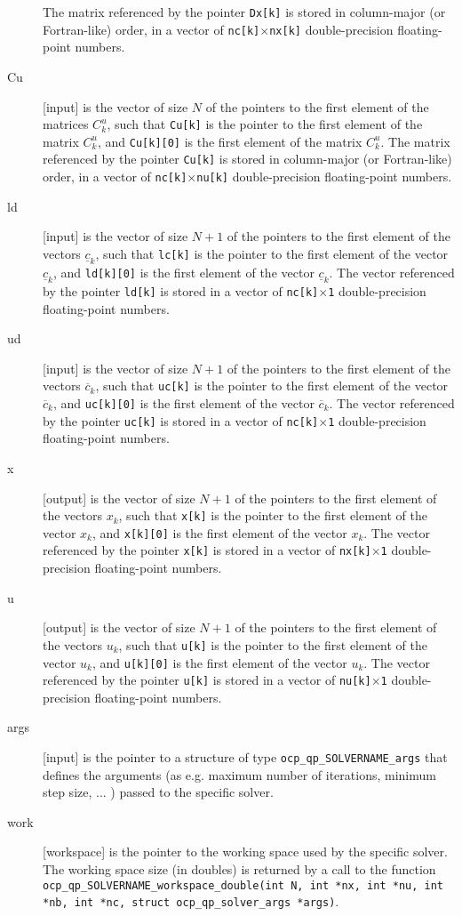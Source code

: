 \documentclass{report}
\begin{document}
\begin{description}
The matrix referenced by the pointer {\tt Dx[k]} is stored in column-major (or Fortran-like) order, in a vector of {\tt nc[k]$\times$nx[k]} double-precision floating-point numbers.
\item[Cu] [input] is the vector of size $N$ of the pointers to the first element of the matrices $C^u_k$, such that {\tt Cu[k]} is the pointer to the first element of the matrix $C^u_k$, and {\tt Cu[k][0]} is the first element of the matrix $C^u_k$.
The matrix referenced by the pointer {\tt Cu[k]} is stored in column-major (or Fortran-like) order, in a vector of {\tt nc[k]$\times$nu[k]} double-precision floating-point numbers.
\item[ld] [input] is the vector of size $N+1$ of the pointers to the first element of the vectors $\underline c_k$, such that {\tt lc[k]} is the pointer to the first element of the vector $\underline c_k$, and {\tt ld[k][0]} is the first element of the vector $\underline c_k$.
The vector referenced by the pointer {\tt ld[k]} is stored in a vector of {\tt nc[k]$\times$1} double-precision floating-point numbers.
\item[ud] [input] is the vector of size $N+1$ of the pointers to the first element of the vectors $\overline c_k$, such that {\tt uc[k]} is the pointer to the first element of the vector $\overline c_k$, and {\tt uc[k][0]} is the first element of the vector $\overline c_k$.
The vector referenced by the pointer {\tt uc[k]} is stored in a vector of {\tt nc[k]$\times$1} double-precision floating-point numbers.
\item[x] [output] is the vector of size $N+1$ of the pointers to the first element of the vectors $x_k$, such that {\tt x[k]} is the pointer to the first element of the vector $x_k$, and {\tt x[k][0]} is the first element of the vector $x_k$.
The vector referenced by the pointer {\tt x[k]} is stored in a vector of {\tt nx[k]$\times$1} double-precision floating-point numbers.
\item[u] [output] is the vector of size $N+1$ of the pointers to the first element of the vectors $u_k$, such that {\tt u[k]} is the pointer to the first element of the vector $u_k$, and {\tt u[k][0]} is the first element of the vector $u_k$.
The vector referenced by the pointer {\tt u[k]} is stored in a vector of {\tt nu[k]$\times$1} double-precision floating-point numbers.
\item[args] [input] is the pointer to a structure of type {\tt ocp\_qp\_SOLVERNAME\_args} that defines the arguments (as e.g. maximum number of iterations, minimum step size, ... ) passed to the specific solver.
\item[work] [workspace] is the pointer to the working space used by the specific solver.
The working space size (in doubles) is returned by a call to the function {\tt ocp\_qp\_SOLVERNAME\_workspace\_double(int N, int *nx, int *nu, int *nb, int *nc, struct ocp\_qp\_solver\_args *args)}. 
\end{description}
\end{document}
